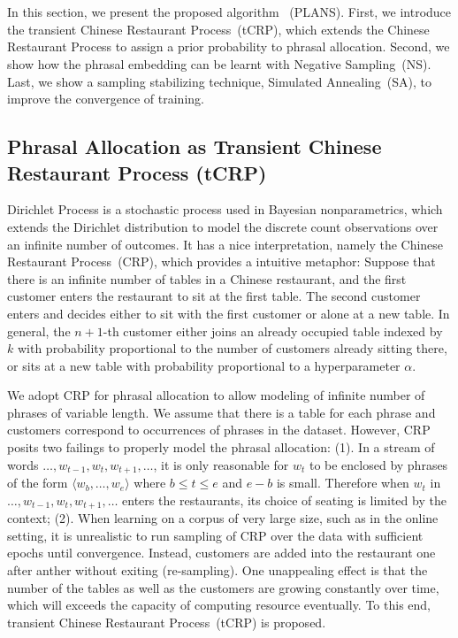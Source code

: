 \section{\PLANS{}}

In this section, we present the proposed algorithm \PLANS{}~(PLANS). First, we
introduce the transient Chinese Restaurant Process~(tCRP), which extends the
Chinese Restaurant Process to assign a prior probability to phrasal allocation.
Second, we show how the phrasal embedding can be learnt with Negative
Sampling~(NS). Last, we show a sampling stabilizing technique, Simulated
Annealing~(SA), to improve the convergence of training.

\subsection{Phrasal Allocation as Transient Chinese Restaurant Process (tCRP)}

Dirichlet Process is a stochastic process used in Bayesian nonparametrics, which
extends the Dirichlet distribution to model the discrete count observations over
an infinite number of outcomes. It has a nice interpretation, namely the Chinese
Restaurant Process~(CRP), which provides a intuitive metaphor: Suppose that
there is an infinite number of tables in a Chinese restaurant, and the first
customer enters the restaurant to sit at the first table. The second customer
enters and decides either to sit with the first customer or alone at a new
table. In general, the $n+1$-th customer either joins an already occupied table
indexed by $k$ with probability proportional to the number of customers already
sitting there, or sits at a new table with probability proportional to a
hyperparameter $\alpha$.

We adopt CRP for phrasal allocation to allow modeling of infinite number of
phrases of variable length. We assume that there is a table for each phrase and
customers correspond to occurrences of phrases in the dataset. However, CRP
posits two failings to properly model the phrasal allocation: (1). In a stream
of words $\dots, w_{t-1}, w_t, w_{t+1}, \dots$, it is only reasonable for $w_t$
to be enclosed by phrases of the form $\langle w_b, \dots, w_e \rangle$ where $b
\le t \le e$ and $e - b$ is small. Therefore when $w_t$ in $\dots, w_{t-1}, w_t,
w_{t+1}, \dots$ enters the restaurants, its choice of seating is limited by the
context; (2). When learning on a corpus of very large size, such as in the
online setting, it is unrealistic to run sampling of CRP over the data with
sufficient epochs until convergence. Instead, customers are added into the
restaurant one after anther without exiting (re-sampling). One unappealing
effect is that the number of the tables as well as the customers are growing
constantly over time, which will exceeds the capacity of computing resource
eventually. To this end, transient Chinese Restaurant Process~(tCRP) is
proposed.

